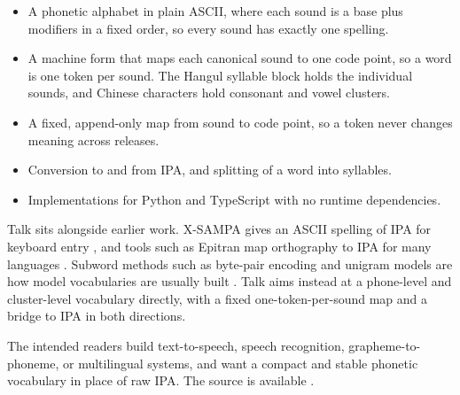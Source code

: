 \begin{itemize}
\item A phonetic alphabet in plain ASCII, where each sound is a base plus modifiers in a fixed order, so every sound has exactly one spelling.
\item A machine form that maps each canonical sound to one code point, so a word is one token per sound. The Hangul syllable block holds the individual sounds, and Chinese characters hold consonant and vowel clusters.
\item A fixed, append-only map from sound to code point, so a token never changes meaning across releases.
\item Conversion to and from IPA, and splitting of a word into syllables.
\item Implementations for Python and TypeScript with no runtime dependencies.
\end{itemize}

Talk sits alongside earlier work. X-SAMPA gives an ASCII spelling of IPA for keyboard entry \cite{wells1995sampa}, and tools such as Epitran map orthography to IPA for many languages \cite{mortensen2018epitran}. Subword methods such as byte-pair encoding and unigram models are how model vocabularies are usually built \cite{sennrich2016bpe, kudo2018sentencepiece}. Talk aims instead at a phone-level and cluster-level vocabulary directly, with a fixed one-token-per-sound map and a bridge to IPA in both directions.

The intended readers build text-to-speech, speech recognition, grapheme-to-phoneme, or multilingual systems, and want a compact and stable phonetic vocabulary in place of raw IPA. The source is available \cite{cluesurf2026talk}.
